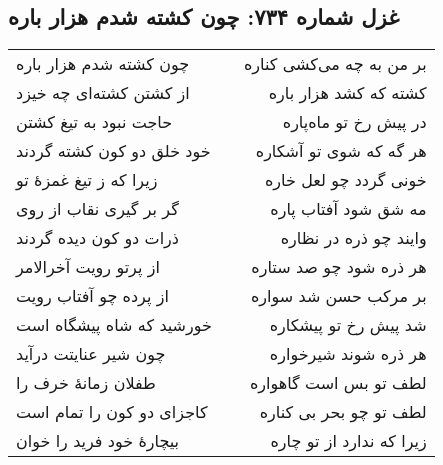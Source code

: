 \begin{center}
\section*{غزل شماره ۷۳۴: چون کشته شدم هزار باره}
\label{sec:734}
\begin{longtable}{l p{0.5cm} r}
چون کشته شدم هزار باره
&&
بر من به چه می‌کشی کناره
\\
از کشتن کشته‌ای چه خیزد
&&
کشته که کشد هزار باره
\\
حاجت نبود به تیغ کشتن
&&
در پیش رخ تو ماه‌پاره
\\
خود خلق دو کون کشته گردند
&&
هر گه که شوی تو آشکاره
\\
زیرا که ز تیغ غمزهٔ تو
&&
خونی گردد چو لعل خاره
\\
گر بر گیری نقاب از روی
&&
مه شق شود آفتاب پاره
\\
ذرات دو کون دیده گردند
&&
وایند چو ذره در نظاره
\\
از پرتو رویت آخرالامر
&&
هر ذره شود چو صد ستاره
\\
از پرده چو آفتاب رویت
&&
بر مرکب حسن شد سواره
\\
خورشید که شاه پیشگاه است
&&
شد پیش رخ تو پیشکاره
\\
چون شیر عنایتت درآید
&&
هر ذره شوند شیرخواره
\\
طفلان زمانهٔ خرف را
&&
لطف تو بس است گاهواره
\\
کاجزای دو کون را تمام است
&&
لطف تو چو بحر بی کناره
\\
بیچارهٔ خود فرید را خوان
&&
زیرا که ندارد از تو چاره
\\
\end{longtable}
\end{center}
